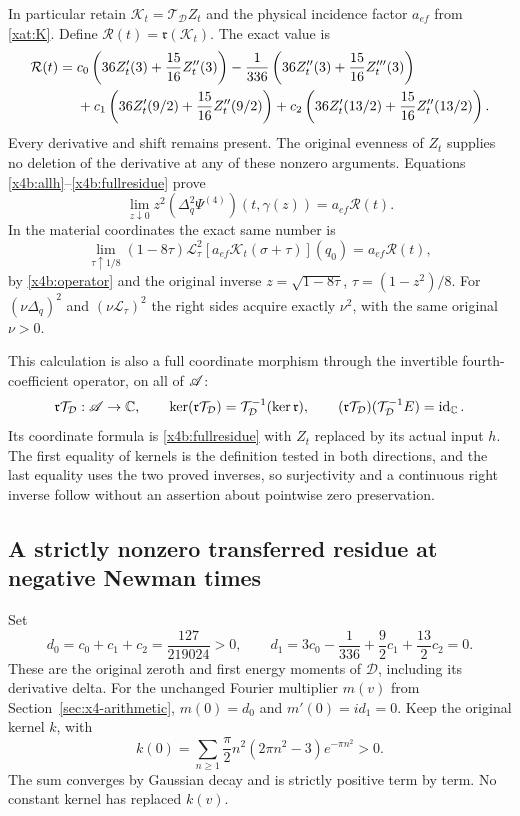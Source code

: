 In particular retain $\mathcal K_t=\mathcal T_{\mathcal D}Z_t$
and the physical incidence factor $a_{ef}$ from \eqref{xat:K}.
Define $\mathcal R(t)=\mathfrak r(\mathcal K_t)$. The exact value is
\begin{align}
 \mathcal R(t)={}&c_0\left(36Z_t'(3)+\frac{15}{16}Z_t''(3)\right)
 -\frac1{336}\left(36Z_t''(3)+\frac{15}{16}Z_t'''(3)\right)\notag\\
 &+c_1\left(36Z_t'(9/2)+\frac{15}{16}Z_t''(9/2)\right)
 +c_2\left(36Z_t'(13/2)+\frac{15}{16}Z_t''(13/2)\right).
 \label{x4b:fullresidue}
\end{align}
Every derivative and shift remains present. The original evenness of
$Z_t$ supplies no deletion of the derivative at any of these nonzero
arguments. Equations \eqref{x4b:allh}--\eqref{x4b:fullresidue} prove
\begin{equation}
 \lim_{z\downarrow0}z^2(\Delta_q^2\Psi^{(4)})(t,\gamma(z))
       =a_{ef}\mathcal R(t).
 \label{x4b:physicalresidue}
\end{equation}
In the material coordinates the exact same number is
\[
 \lim_{\tau\uparrow1/8}(1-8\tau)
 \mathcal L_\tau^2
       [a_{ef}\mathcal K_t(\sigma+\tau)](q_0)=a_{ef}\mathcal R(t),
\]
by \eqref{x4b:operator} and the original inverse
$z=\sqrt{1-8\tau}$, $\tau=(1-z^2)/8$. For $(\nu\Delta_q)^2$
and $(\nu\mathcal L_\tau)^2$ the right sides acquire exactly
$\nu^2$, with the same original $\nu>0$.

This calculation is also a full coordinate morphism through the
invertible fourth-coefficient operator, on all of $\mathscr A$:
\[
 \mathfrak r\mathcal T_{\mathcal D}:\mathscr A\to\mathbb C,
 \qquad
 \ker(\mathfrak r\mathcal T_{\mathcal D})
       =\mathcal T_{\mathcal D}^{-1}(\ker\mathfrak r),\qquad
 (\mathfrak r\mathcal T_{\mathcal D})
       (\mathcal T_{\mathcal D}^{-1}E)=\operatorname{id}_{\mathbb C}.
\]
Its coordinate formula is \eqref{x4b:fullresidue} with $Z_t$
replaced by its actual input $h$. The first equality of kernels
is the definition tested in both directions, and the last equality
uses the two proved inverses, so surjectivity and a continuous right
inverse follow without an assertion about pointwise zero preservation.

\subsection{A strictly nonzero transferred residue at negative Newman times}
\label{x4b:negative}
Set
\[
 d_0=c_0+c_1+c_2=\frac{127}{219024}>0,\qquad
 d_1=3c_0-\frac1{336}+\frac92c_1+\frac{13}2c_2=0.
\]
These are the original zeroth and first energy moments of
$\mathcal D$, including its derivative delta. For the unchanged
Fourier multiplier $m(v)$ from Section~\ref{sec:x4-arithmetic},
$m(0)=d_0$ and $m'(0)=id_1=0$. Keep the original kernel $k$,
with
\[
 k(0)=\sum_{n\geq1}\frac\pi2n^2(2\pi n^2-3)e^{-\pi n^2}>0.
\]
The sum converges by Gaussian decay and is strictly positive term
by term. No constant kernel has replaced $k(v)$.

